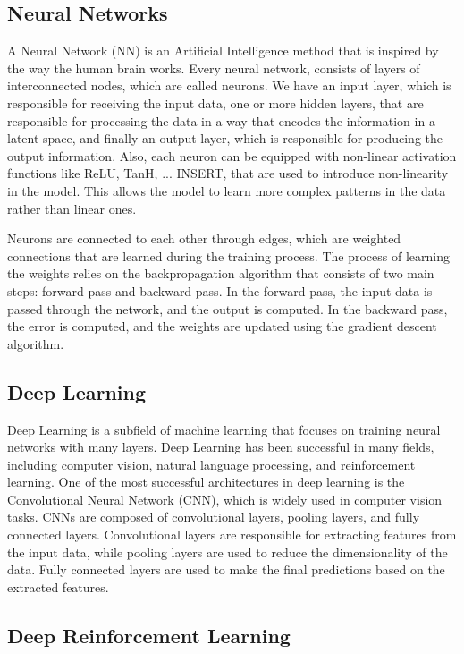 \subsection{Neural Networks}
A Neural Network (NN) is an Artificial Intelligence method that is inspired by the way the human brain works.
Every neural network, consists of layers of interconnected nodes, which are called neurons.
We have an input layer, which is responsible for receiving the input data, one or more hidden layers, that are responsible for processing the data in a way that encodes the information in a latent space, and finally an output layer, which is responsible for producing the output information.
Also, each neuron can be equipped with non-linear activation functions like ReLU, TanH, ... INSERT, that are used to introduce non-linearity in the model.
This allows the model to learn more complex patterns in the data rather than linear ones.

Neurons are connected to each other through edges, which are weighted connections that are learned during the training process.
The process of learning the weights relies on the backpropagation algorithm that consists of two main steps: forward pass and backward pass.
In the forward pass, the input data is passed through the network, and the output is computed.
In the backward pass, the error is computed, and the weights are updated using the gradient descent algorithm.


\subsection{Deep Learning}
Deep Learning is a subfield of machine learning that focuses on training neural networks with many layers.
Deep Learning has been successful in many fields, including computer vision, natural language processing, and reinforcement learning.
One of the most successful architectures in deep learning is the Convolutional Neural Network (CNN), which is widely used in computer vision tasks.
CNNs are composed of convolutional layers, pooling layers, and fully connected layers.
Convolutional layers are responsible for extracting features from the input data, while pooling layers are used to reduce the dimensionality of the data.
Fully connected layers are used to make the final predictions based on the extracted features.



\subsection{Deep Reinforcement Learning}

